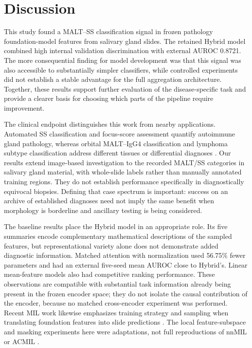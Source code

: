 \section{Discussion}
This study found a MALT--SS classification signal in frozen pathology foundation-model features from salivary gland slides. The retained Hybrid model combined high internal validation discrimination with external AUROC 0.8721. The more consequential finding for model development was that this signal was also accessible to substantially simpler classifiers, while controlled experiments did not establish a stable advantage for the full aggregation architecture. Together, these results support further evaluation of the disease-specific task and provide a clearer basis for choosing which parts of the pipeline require improvement.

The clinical endpoint distinguishes this work from nearby applications. Automated SS classification and focus-score assessment quantify autoimmune gland pathology, whereas orbital MALT--IgG4 classification and lymphoma subtype classification address different tissues or differential diagnoses \citep{ref10,focus2025,ref11,lymphoma2025}. Our results extend image-based investigation to the recorded MALT/SS categories in salivary gland material, with whole-slide labels rather than manually annotated training regions. They do not establish performance specifically in diagnostically equivocal biopsies. Defining that case spectrum is important: success on an archive of established diagnoses need not imply the same benefit when morphology is borderline and ancillary testing is being considered.

The baseline results place the Hybrid model in an appropriate role. Its five summaries encode complementary mathematical descriptions of the sampled features, but representational variety alone does not demonstrate added diagnostic information. Matched attention with normalization used 56.75\% fewer parameters and had an external five-seed mean AUROC close to Hybrid's. Linear mean-feature models also had competitive ranking performance. These observations are compatible with substantial task information already being present in the frozen encoder space; they do not isolate the causal contribution of the encoder, because no matched cross-encoder experiment was performed. Recent MIL work likewise emphasizes training strategy and sampling when translating foundation features into slide predictions \citep{nnmil2026}. The local feature-subspace and masking experiments here were adaptations, not full reproductions of nnMIL or ACMIL \citep{acmil2024}.

